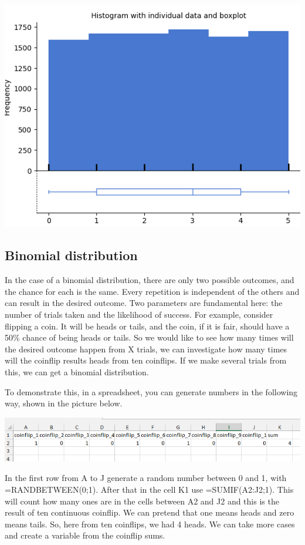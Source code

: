 \documentclass[
]{book}
\begin{document}
\includegraphics{img/ch4/4.3randhistofor10000.png}

\hypertarget{binomial-distribution}{%
\subsection{Binomial distribution}\label{binomial-distribution}}

In the case of a binomial distribution, there are only two possible outcomes, and the chance for each is the same. Every repetition is independent of the others and can result in the desired outcome. Two parameters are fundamental here: the number of trials taken and the likelihood of success. For example, consider flipping a coin. It will be heads or tails, and the coin, if it is fair, should have a 50\% chance of being heads or tails. So we would like to see how many times will the desired outcome happen from X trials, we can investigate how many times will the coinflip results heads from ten coinflips. If we make several trials from this, we can get a binomial distribution.

To demonstrate this, in a spreadsheet, you can generate numbers in the following way, shown in the picture below.

\includegraphics{img/ch4/4.4coinflip1trial.png}

In the first row from A to J generate a random number between 0 and 1, with =RANDBETWEEN(0;1). After that in the cell K1 use =SUMIF(A2:J2;1). This will count how many ones are in the cells between A2 and J2 and this is the result of ten continuous coinflip. We can pretend that one means heads and zero means tails. So, here from ten coinflips, we had 4 heads. We can take more cases and create a variable from the coinflip sums.
\end{document}
